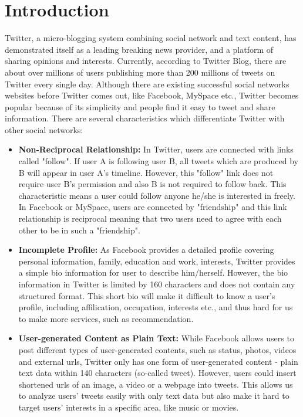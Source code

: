 \section{Introduction}

Twitter, a micro-blogging system combining social network and text content, has demonstrated itself as a leading breaking news provider, and a platform of sharing opinions and interests. Currently, according to Twitter Blog\cite{twitterblog}, there are about over millions of users publishing more than 200 millions of tweets on Twitter every single day. Although there are existing successful social networks websites before Twitter comes out, like Facebook, MySpace etc., Twitter becomes popular because of its simplicity and people find it easy to tweet and share information. There are several characteristics which differentiate Twitter with other social networks:

\begin{itemize}

\item \textbf{Non-Reciprocal Relationship: } In Twitter, users are connected with links called "follow". If user A is following user B, all tweets which are produced by B will appear in user A's timeline. However, this "follow" link does not require user B's permission and also B is not required to follow back. This characteristic means a user could follow anyone he/she is interested in freely. In Facebook or MySpace, users are connected by "friendship" and this link relationship is reciprocal meaning that two users need to agree with each other to be in such a "friendship".

\item \textbf{Incomplete Profile: } As Facebook provides a detailed profile covering personal information, family, education and work, interests, Twitter provides a simple bio information for user to describe him/herself. However, the bio information in Twitter is limited by 160 characters and does not contain any structured format. This short bio will make it difficult to know a user's profile, including affilication, occupation, interests etc., and thus hard for us to make more services, such as recommendation.

\item \textbf{User-generated Content as Plain Text: } While Facebook allows users to post different types of user-generated contents, such as status, photos, videos and external urls, Twitter only has one form of user-generated content - plain text data within 140 characters (so-called tweet). However, users could insert shortened urls of an image, a video or a webpage into tweets. This allows us to analyze users' tweets easily with only text data but also make it hard to target users' interests in a specific area, like music or movies.

\end{itemize}

